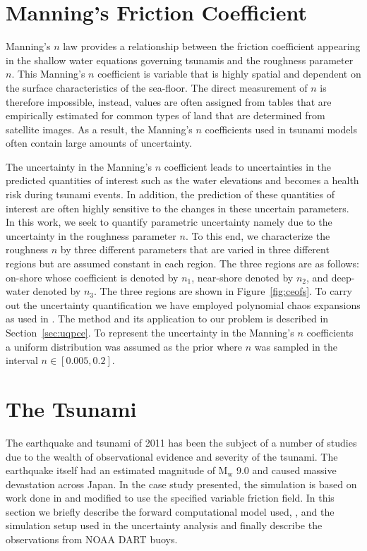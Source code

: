 \section{Manning's Friction Coefficient}
\label{sec:manning}

Manning's $n$ law provides a relationship between the friction coefficient appearing in the shallow
water equations governing tsunamis and the roughness parameter $n$. 
This Manning's $n$ coefficient is variable that is highly spatial 
and dependent on the surface characteristics of the sea-floor. 
The direct measurement of $n$ is therefore impossible, instead, values
are often assigned from tables that are empirically estimated
for common types of land that are determined from satellite images.
As a result, the Manning's $n$ coefficients used in tsunami models
often contain large amounts of uncertainty.

The uncertainty in the Manning's $n$ coefficient leads to uncertainties
in the predicted quantities of interest such as the water elevations
and becomes a health risk during tsunami events. In addition, 
the prediction of these quantities of interest are often highly sensitive to 
the changes in these uncertain parameters. 
In this work, we seek to quantify parametric uncertainty namely due 
to the uncertainty in the roughness parameter $n$. To this end,
we characterize the roughness $n$ by three different parameters
that are varied in three different regions but are assumed
constant in each region. The three regions are as follows: 
on-shore whose coefficient is denoted by $n_1$, near-shore 
denoted by $n_2$, and deep-water denoted by $n_3$.
The three regions are shown in Figure~\ref{fig:ceofs}.
To carry out the uncertainty quantification we have employed polynomial chaos expansions 
as used in \cite{sraj:2013a,sraj:2013b}. The method and its application
to our problem is described in Section~\ref{sec:uqpce}.  
To represent the uncertainty in the Manning's $n$ coefficients a uniform 
distribution was assumed as the prior where $n$ was sampled in the interval $n \in [0.005,0.2]$.  

\section{The \tohoku Tsunami} 
\label{ssub:tohoku}

The \tohoku earthquake and tsunami of 2011 has been the subject of a number of studies due to the wealth of observational evidence and severity of the tsunami.  The earthquake itself had an estimated magnitude of $\text{M}_\text{w}$ 9.0 and caused massive devastation across Japan.  In the case study presented, the simulation is based on work done in \cite{MacInnes:2013cr} and modified to use the specified variable friction field.
In this section we briefly describe the forward computational model used, \geoclaw, and the 
simulation setup used in the uncertainty analysis and finally describe
the observations from NOAA DART buoys.

